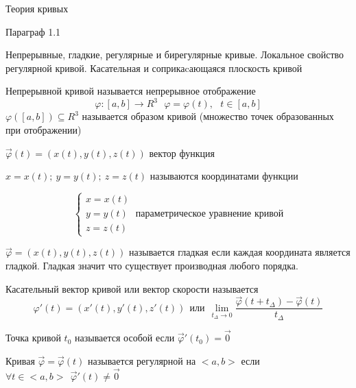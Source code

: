 \begin{title}
  Теория кривых
\end{title}

\begin{title}[\Large]
  Параграф 1.1
\end{title}

\begin{title}[\Large]
  Непрерывные, гладкие, регулярные и бирегулярные кривые. Локальное свойство
  регулярной кривой. Касательная и соприкаcающаяся плоскость кривой
\end{title}

\begin{define}
  Непрерывной кривой называется непрерывное отображение
  $$
  \varphi: [a,b] \to R^3 ~~~ \varphi = \varphi (t), ~~~ t \in [a,b]
  $$
  $\varphi ([a,b]) \subseteq R^3$ называется образом кривой (множество точек
  образованных при отображении)

  $\vec \varphi (t) = ( x(t), y(t), z(t) )$ вектор функция

  $x = x(t); ~ y = y(t); ~ z = z(t)$ называются координатами функции

  $$
  \left\{
  \begin{array}{c}
    x = x(t) \\
    y = y(t) \\
    z = z(t)
  \end{array}
  \right. ~ \text{параметрическое уравнение кривой}
  $$
\end{define}

\begin{define}
  $\vec \varphi = ( x(t), y(t), z(t) )$ называется гладкая если каждая координата
  является гладкой. Гладкая значит что существует производная любого порядка.
\end{define}

\begin{define}
  Касательный вектор кривой или вектор скорости называется
  $$
  \varphi' (t) = ( x'(t), y'(t), z'(t) ) ~~ \text{или} ~~
  \lim_{ t_{\Delta} \to 0 }
  \frac{ \vec \varphi (t + t_{\Delta}) - \vec \varphi (t) }{t_{\Delta}}
  $$

  Точка кривой $t_0$ называется особой если $\vec \varphi' (t_0) = \vec 0$
\end{define}

\begin{define}
  Кривая $\vec \varphi = \vec \varphi (t)$ называется регулярной на $<a,b>$ если
  $\forall t \in <a,b> ~~ \vec \varphi' (t) \not = \vec 0$
\end{define}

